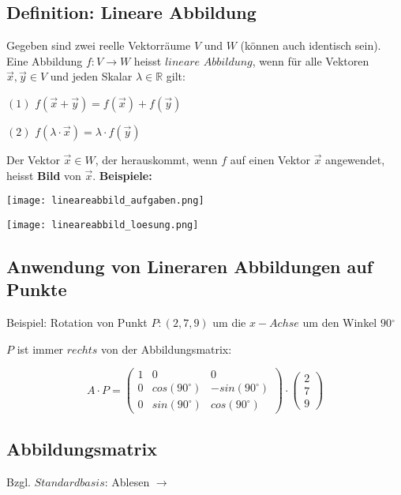 \begin{multicols*}{3}
    \subsection{Definition: Lineare Abbildung}
    { Gegeben sind zwei reelle Vektorräume $V$ und $W$ (können auch identisch sein).}
    {Eine Abbildung $f:V \rightarrow W$ heisst $lineare$ $Abbildung$, wenn für alle Vektoren $\vec{x},\vec{y} \in  V$ und jeden Skalar $\lambda \in \mathbb{R} $ gilt:}

    {$(1)$ $f(\vec{x}+\vec{y})=f(\vec{x}) + f(\vec{y})$}

    {$(2)$ $f(\lambda \cdot \vec{x})=\lambda \cdot f(\vec{y})$}
    \WhiteSpace

    {Der Vektor $\vec{x} \in W$, der herauskommt, wenn $f$ auf einen Vektor $\vec{x}$ angewendet, heisst \textbf{Bild} von $\vec{x}$.}
    \WhiteSpace
    {\textbf{Beispiele:}}

    {\texttt{[image: lineareabbild\_aufgaben.png]}}

    {\texttt{[image: lineareabbild\_loesung.png]}}

    \subsection{Anwendung von Lineraren Abbildungen auf Punkte}
    {Beispiel: Rotation von Punkt $P:(2,7,9)$ um die $x-Achse$ um den Winkel $90$$^{\circ}$}

    {$P$ ist immer $rechts$ von der Abbildungsmatrix:}



    $$A \cdot P = \begin{pmatrix}
            1 & 0       & 0        \\
            0 & cos(90^{\circ}) & -sin(90^{\circ}) \\
            0 & sin(90^{\circ}) & cos(90^{\circ})
        \end{pmatrix} \cdot \begin{pmatrix}
            2 \\
            7 \\
            9
        \end{pmatrix}$$

    \vfill\null
    \columnbreak
    \subsection{Abbildungsmatrix}
    {Bzgl. $Standardbasis$: Ablesen $\to$}


\end{multicols*}

